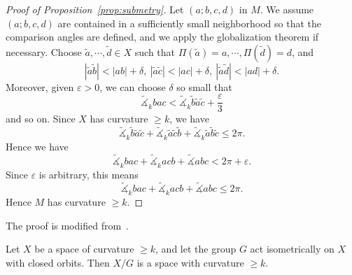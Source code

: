 \begin{proof}[Proof of Proposition~\ref{prop:submetry}]
    Let $(a;b,c,d)$ in $M$.
    We assume $(a;b,c,d)$ are contained in a sufficiently small neighborhood so that the comparison angles are defined, and we apply the globalization theorem if necessary.
    Choose $\tilde{a},\cdots,\tilde{d}\in X$ such that $\Pi(\tilde{a})=a,\cdots,\Pi(\tilde{d})=d$, and
    \[|\tilde{a}\tilde{b}|<|ab|+\delta,\ |\tilde{a}\tilde{c}|<|ac|+\delta,\ |\tilde{a}\tilde{d}|<|ad|+\delta.\]
    Moreover, given $\varepsilon>0$, we can choose $\delta$ so small that
    \[\tilde{\measuredangle}_kbac<\tilde{\measuredangle}_k\tilde{b}\tilde{a}\tilde{c}+\frac{\varepsilon}{3}\]
    and so on.
    Since $X$ has curvature $\geq k$, we have
    \[\tilde{\measuredangle}_k\tilde{b}\tilde{a}\tilde{c}+\tilde{\measuredangle}_k\tilde{a}\tilde{c}\tilde{b}+\tilde{\measuredangle}_k\tilde{a}\tilde{b}\tilde{c}\leq 2\pi.\]
    Hence we have
    \[\tilde{\measuredangle}_kbac+\tilde{\measuredangle}_kacb+\tilde{\measuredangle}abc<2\pi+\varepsilon.\]
    Since $\varepsilon$ is arbitrary, this means
    \[\tilde{\measuredangle}_kbac+\tilde{\measuredangle}_kacb+\tilde{\measuredangle}abc\leq 2\pi.\]
    Hence $M$ has curvature $\geq k$.
\end{proof}

The proof is modified from~\cite[Theorem 8.5]{alexanderAlexandrovGeometry2024}.

\begin{cor}
    Let $X$ be a space of curvature $\geq k$, and let the group $G$ act isometrically on $X$ with closed orbits.
    Then $X/G$ is a space with curvature $\geq k$.
\end{cor}